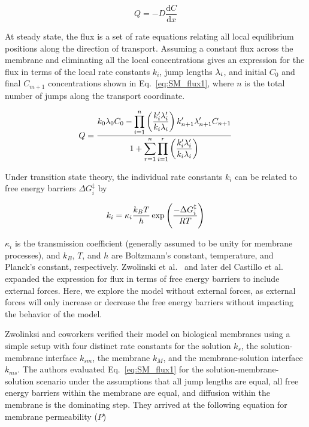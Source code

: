 \begin{equation}
    Q = -D \frac{\text{d}C}{\text{d}x}
    \label{eq:SM_ficks_law}
\end{equation}

At steady state, the flux is a set of rate equations relating all local equilibrium positions along the direction of transport. Assuming a constant flux across the membrane and eliminating all the local concentrations gives an expression for the flux in terms of the local rate constants $k_i$, jump lengths $\lambda_{i}$, and initial $C_0$ and final $C_{m+1}$ concentrations shown in Eq.~\ref{eq:SM_flux1}, where $n$ is the total number of jumps along the transport coordinate.

\begin{equation}
    Q = \frac{ \displaystyle k_0 \lambda_{0} C_0 - \prod_{i=1}^n \left( \frac{k_i' \lambda_{i}'}{k_i \lambda_{i}} \right) k_{n+1}' \lambda_{n+1}' C_{n+1} } { \displaystyle 1 +  \sum_{r=1}^n \prod_{i=1}^r \left( \frac{k_i' \lambda_{i}'}{k_i \lambda_{i}} \right) }
    \label{eq:SM_flux1}
\end{equation}

\noindent Under transition state theory, the individual rate constants $k_i$ can be related to free energy barriers $\Delta G^{\ddagger}_i$ by 

\begin{equation}
    k_i = \kappa_i \frac{k_B T}{h} \exp{\left( \frac{-\Delta G^{\ddagger}_i}{R T} \right)}
    \label{eq:SM_TST_rate_constant1}
\end{equation}

\noindent $\kappa_i$ is the transmission coefficient (generally assumed to be unity for membrane processes), and $k_B$, $T$, and $h$ are Boltzmann's constant, temperature, and Planck's constant, respectively. Zwolinski et al.~\cite{zwolinski_diffusion_1949} and later del Castillo et al.~\cite{del_castillo_energy-barrier_1979} expanded the expression for flux in terms of free energy barriers to include external forces. Here, we explore the model without external forces, as external forces will only increase or decrease the free energy barriers without impacting the behavior of the model. 

Zwolinksi and coworkers verified their model on biological membranes using a simple setup with four distinct rate constants for the solution $k_s$, the solution-membrane interface $k_{sm}$, the membrane $k_M$, and the membrane-solution interface $k_{ms}$. The authors evaluated Eq.~\ref{eq:SM_flux1} for the solution-membrane-solution scenario under the assumptions that all jump lengths are equal, all free energy barriers within the membrane are equal, and diffusion within the membrane is the dominating step. They arrived at the following equation for membrane permeability ($P$)


